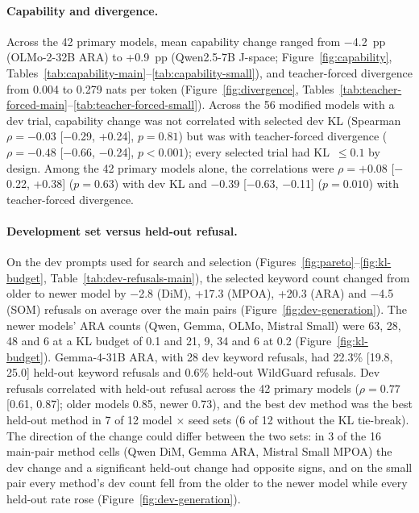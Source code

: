 \paragraph{Capability and divergence.} Across the 42 primary models, mean
capability change ranged from $-$4.2~pp (OLMo-2-32B ARA) to +0.9~pp
(Qwen2.5-7B J-space; Figure~\ref{fig:capability},
Tables~\ref{tab:capability-main}--\ref{tab:capability-small}), and
teacher-forced divergence from 0.004 to 0.279 nats per token
(Figure~\ref{fig:divergence},
Tables~\ref{tab:teacher-forced-main}--\ref{tab:teacher-forced-small}). Across
the 56 modified models with a dev trial, capability change was not correlated
with selected dev KL (Spearman $\rho=-0.03$ [$-$0.29, +0.24], $p=0.81$) but
was with teacher-forced divergence ($\rho=-0.48$ [$-$0.66, $-$0.24],
$p<0.001$); every selected trial had KL~$\le 0.1$ by design. Among the 42
primary models alone, the correlations were $\rho=+0.08$ [$-$0.22, +0.38]
($p=0.63$) with dev KL and $-0.39$ [$-$0.63, $-$0.11] ($p=0.010$) with
teacher-forced divergence.



\paragraph{Development set versus held-out refusal.} On the dev prompts used
for search and selection (Figures~\ref{fig:pareto}--\ref{fig:kl-budget},
Table~\ref{tab:dev-refusals-main}), the selected keyword count changed from
older to newer model by $-$2.8 (DiM), +17.3
(MPOA), +20.3 (ARA) and $-$4.5 (SOM) refusals on average over the main pairs
(Figure~\ref{fig:dev-generation}). The newer models' ARA counts (Qwen, Gemma,
OLMo, Mistral Small) were 63, 28, 48 and 6 at a KL budget of 0.1 and 21, 9, 34
and 6 at 0.2 (Figure~\ref{fig:kl-budget}). Gemma-4-31B ARA, with 28 dev
keyword refusals, had 22.3\% [19.8, 25.0] held-out keyword refusals and 0.6\%
held-out WildGuard refusals. Dev refusals correlated with held-out refusal
across the 42 primary models ($\rho=0.77$ [0.61, 0.87]; older models 0.85,
newer 0.73), and the best dev method was the
best held-out method in 7 of 12 model $\times$ seed sets (6 of 12 without the
KL tie-break).
The direction of the change could differ between the two sets: in 3 of the 16
main-pair method cells (Qwen DiM, Gemma ARA, Mistral Small MPOA) the dev change
and a significant held-out change had opposite signs, and on the small pair
every method's dev count fell from the older to the newer model while every
held-out rate rose (Figure~\ref{fig:dev-generation}).

